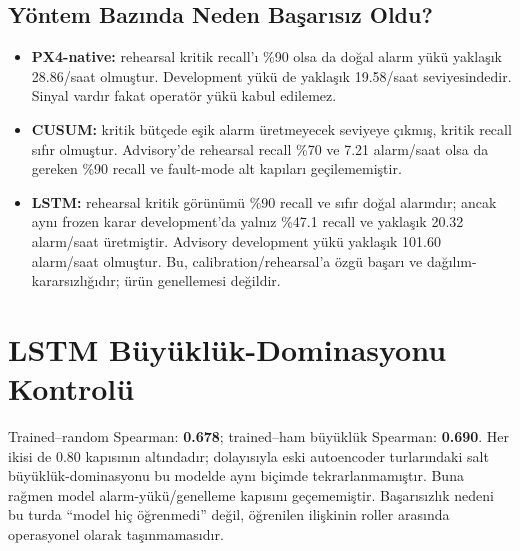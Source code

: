 \documentclass[11pt,a4paper]{article}
\begin{document}
\subsection{Yöntem Bazında Neden Başarısız Oldu?}
\begin{itemize}
  \item \textbf{PX4-native:} rehearsal kritik recall'ı \%90 olsa da doğal
  alarm yükü yaklaşık 28.86/saat olmuştur. Development yükü de yaklaşık
  19.58/saat seviyesindedir. Sinyal vardır fakat operatör yükü kabul edilemez.
  \item \textbf{CUSUM:} kritik bütçede eşik alarm üretmeyecek seviyeye çıkmış,
  kritik recall sıfır olmuştur. Advisory'de rehearsal recall \%70 ve
  7.21 alarm/saat olsa da gereken \%90 recall ve fault-mode alt kapıları
  geçilememiştir.
  \item \textbf{LSTM:} rehearsal kritik görünümü \%90 recall ve sıfır doğal
  alarmdır; ancak aynı frozen karar development'da yalnız \%47.1 recall ve
  yaklaşık 20.32 alarm/saat üretmiştir. Advisory development yükü yaklaşık
  101.60 alarm/saat olmuştur. Bu, calibration/rehearsal'a özgü başarı ve
  dağılım-kararsızlığıdır; ürün genellemesi değildir.
\end{itemize}

\section{LSTM Büyüklük-Dominasyonu Kontrolü}
Trained--random Spearman: \textbf{0.678};
trained--ham büyüklük Spearman:
\textbf{0.690}.
Her ikisi de 0.80 kapısının altındadır; dolayısıyla eski autoencoder turlarındaki
salt büyüklük-dominasyonu bu modelde aynı biçimde tekrarlanmamıştır. Buna rağmen
model alarm-yükü/genelleme kapısını geçememiştir. Başarısızlık nedeni bu turda
``model hiç öğrenmedi'' değil, öğrenilen ilişkinin roller arasında operasyonel
olarak taşınmamasıdır.
\end{document}
